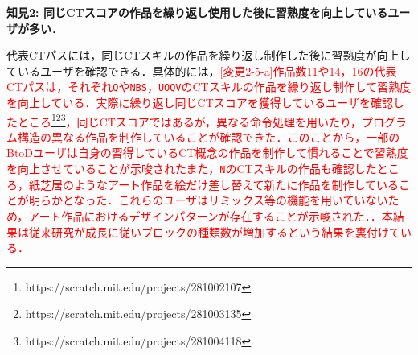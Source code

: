 \documentclass[submit]{ipsj}
\begin{document}
\noindent\textbf{知見2: 同じCTスコアの作品を繰り返し使用した後に習熟度を向上しているユーザが多い}．

代表CTパスには，同じCTスキルの作品を繰り返し制作した後に習熟度が向上しているユーザを確認できる．具体的には，\textcolor{red}{[変更2-5-a]作品数11や14，16の代表CTパスは，それぞれ\texttt{\large{Q}}や\texttt{\large{NBS}}，\texttt{\large{UOQV}}のCTスキルの作品を繰り返し制作して習熟度を向上している．実際に繰り返し同じCTスコアを獲得しているユーザを確認したところ\footnote{https://scratch.mit.edu/projects/281002107}\footnote{https://scratch.mit.edu/projects/281003135}\footnote{https://scratch.mit.edu/projects/281004118}，同じCTスコアではあるが，異なる命令処理を用いたり，プログラム構造の異なる作品を制作していることが確認できた．このことから，一部のBtoDユーザは自身の習得しているCT概念の作品を制作して慣れることで習熟度を向上させていることが示唆されたまた，\texttt{\large{N}}のCTスキルの作品も確認したところ，紙芝居のようなアート作品を絵だけ差し替えて新たに作品を制作していることが明らかとなった．これらのユーザはリミックス等の機能を用いていないため，アート作品におけるデザインパターンが存在することが示唆された．．本結果は従来研究\cite{Yang_2015}が成長に従いブロックの種類数が増加するという結果を裏付けている．}

\end{document}
